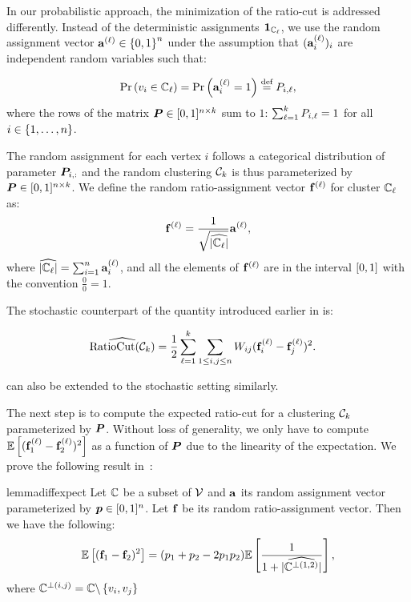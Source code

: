 In our probabilistic approach, the minimization of the ratio-cut is addressed
differently. Instead of the deterministic assignments ${\bm{1}}_{{\mathbb{C}}_\ell}$, we use
the random assignment vector ${\mathbf{a}}^{(\ell)} \in \left\lbrace0,1\right\rbrace^n$ under the assumption
that $({\mathbf{a}}_i^{(\ell)})_i$ are independent random variables such that:

\[
	\operatorname{Pr}\left(v_i \in {\mathbb{C}}_\ell\right) = \operatorname{Pr}\left({\mathbf{a}}^{(\ell)}_i = 1\right) \stackrel{\text{def}}{=}  {P}_{i,\ell},
\]
where the rows of the matrix ${\bm{P}}\in[0,1]^{n\times k}$ sum to $1$:
  $\sum_{\ell=1}^k {P}_{i,\ell} = 1$ for all $i\in\left\lbrace1,\ldots,n\right\rbrace$.

The random assignment for each vertex $i$ follows a categorical distribution of
parameter ${\bm{P}}_{i,:}$ and the random clustering ${\mathcal{C}}_k$ is thus parameterized by
${\bm{P}}\in[0,1]^{n\times k}$. We define the random ratio-assignment vector
${\mathbf{f}}^{(\ell)}$ for cluster ${\mathbb{C}}_\ell$ as:
\[
	{\mathbf{f}}^{(\ell)} = {\frac{1}{\sqrt{\widehat{|{\mathbb{C}}_\ell|}}}}{\mathbf{a}}^{(\ell)},
\]
where $\widehat{|{\mathbb{C}}_\ell|} = \sum_{i=1}^{n}{\mathbf{a}}^{(\ell)}_i$, and all the
  elements of ${\mathbf{f}}^{(\ell)}$ are in the interval $\left[0,1\right]$ with the convention
  $\frac{0}{0} = 1$.

The stochastic counterpart of the quantity introduced earlier in 
is:

\begin{align}
	\label{eq:stochasticrcut}
	\widehat{\operatorname*{RatioCut}({\mathcal{C}}_k)}
	 & = {\frac{1}{2}}\sum_{\ell=1}^k \sum_{1 \leq i,j\leq n} {W}_{ij} ({\mathbf{f}}^{(\ell)}_i-{\mathbf{f}}^{(\ell)}_j)^2.
\end{align}

 can also be extended to the stochastic setting similarly.

The next step is to compute the expected ratio-cut for a clustering ${\mathcal{C}}_k$
parameterized by ${\bm{P}}$. Without loss of generality, we only have to compute
$\mathbb{E}\left[({\mathbf{f}}^{(\ell)}_1-{\mathbf{f}}^{(\ell)}_2)^2\right]$ as a function of ${\bm{P}}$ due to the
linearity of the expectation. We prove the following result
in~:

\begin{restatable}{lemma}{diffexpect}
	\label{lemma:diffexpect}
	Let ${\mathbb{C}}$ be a subset of ${\mathcal{V}}$ and ${\mathbf{a}}$ its random assignment vector
	parameterized by ${\bm{p}}\in[0,1]^n$. Let ${\mathbf{f}}$ be its random ratio-assignment
	vector. Then we have the following:
	\begin{align*}
		\mathbb{E}\left[({\mathbf{f}}_1-{\mathbf{f}}_2)^2\right] = ({p}_1 + {p}_2 -2 {p}_1 {p}_2)\mathbb{E}\left[{\frac{1}{1 + \widehat{|{\mathbb{C}}^{\perp(1,2)}|}}}\right],
	\end{align*}
	where ${\mathbb{C}}^{\perp(i,j)} = {\mathbb{C}} \backslash \left\lbrace v_i, v_j\right\rbrace$
\end{restatable}

